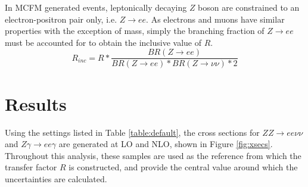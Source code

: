 \documentclass[12pt,a4paper,openright,twoside]{report}
\begin{document}
In MCFM generated events, leptonically decaying $Z$ boson are constrained to an electron-positron pair only, i.e. $Z\to ee$. As electrons and muons have similar properties with the exception of mass, simply the branching fraction of $Z\rightarrow ee$ must be accounted for to obtain the inclusive value of $R$.
\begin{equation}\label{eq:R_inc}
	R_{inc} = R * \frac{BR(Z\rightarrow ee)}{BR(Z \rightarrow ee)*BR(Z\rightarrow \nu\nu)*2}
\end{equation}

\section{Results}
Using the settings listed in Table \ref{table:default}, the cross sections for $ZZ\to ee\nu\nu$ and $Z\gamma\to ee\gamma$ are generated at LO and NLO, shown in Figure \ref{fig:xsecs}. Throughout this analysis, these samples are used as the reference from which the transfer factor $R$ is constructed, and provide the central value around which the uncertainties are calculated.
\end{document}

